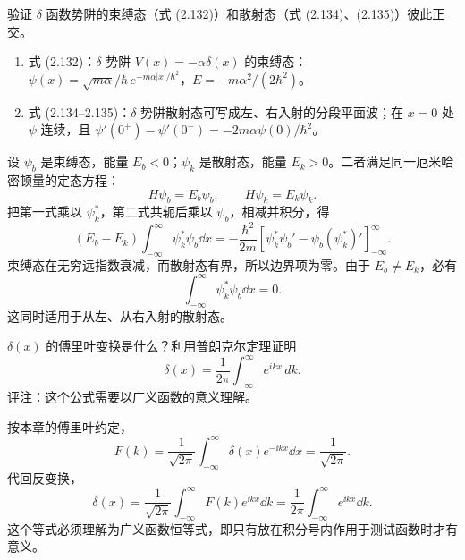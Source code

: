 \begin{question}
验证 $\delta$ 函数势阱的束缚态（式 (2.132)）和散射态（式 (2.134)、(2.135)）彼此正交。

\par\smallskip
{}
\begin{enumerate}[leftmargin=2.2em,itemsep=0.12em,topsep=0.12em,parsep=0pt]
\item 式 (2.132)：$\delta$ 势阱 $V(x)=-\alpha\delta(x)$ 的束缚态：$\psi(x)=\sqrt{m\alpha}/\hbar\,e^{-m\alpha|x|/\hbar^2}$，$E=-m\alpha^2/(2\hbar^2)$。
\item 式 (2.134--2.135)：$\delta$ 势阱散射态可写成左、右入射的分段平面波；在 $x=0$ 处 $\psi$ 连续，且 $\psi'(0^+)-\psi'(0^-)=-2m\alpha\psi(0)/\hbar^2$。
\end{enumerate}

\end{question}
\begin{solution}
设 $\psi_b$ 是束缚态，能量 $E_b<0$；$\psi_k$ 是散射态，能量 $E_k>0$。二者满足同一厄米哈密顿量的定态方程：
\[
H\psi_b=E_b\psi_b,
\qquad
H\psi_k=E_k\psi_k.
\]
把第一式乘以 $\psi_k^*$，第二式共轭后乘以 $\psi_b$，相减并积分，得
\[
(E_b-E_k)\int_{-\infty}^{\infty}\psi_k^*\psi_b\dd x
=-\frac{\hbar^2}{2m}\left[\psi_k^*\psi_b'-\psi_b(\psi_k^*)'\right]_{-\infty}^{\infty}.
\]
束缚态在无穷远指数衰减，而散射态有界，所以边界项为零。由于 $E_b\ne E_k$，必有
\[
\int_{-\infty}^{\infty}\psi_k^*\psi_b\dd x=0.
\]
这同时适用于从左、从右入射的散射态。
\end{solution}

\begin{question}
$\delta(x)$ 的傅里叶变换是什么？利用普朗克尔定理证明
\[
\delta(x)=\frac{1}{2\pi}\int_{-\infty}^{\infty}e^{ikx}\,dk .
\]
评注：这个公式需要以广义函数的意义理解。
\end{question}
\begin{solution}
按本章的傅里叶约定，
\[
F(k)=\frac1{\sqrt{2\pi}}\int_{-\infty}^{\infty}\delta(x)e^{-\ii kx}\dd x
=\frac1{\sqrt{2\pi}}.
\]
代回反变换，
\[
\delta(x)=\frac1{\sqrt{2\pi}}\int_{-\infty}^{\infty}F(k)e^{\ii kx}\dd k
=\frac1{2\pi}\int_{-\infty}^{\infty}e^{\ii kx}\dd k.
\]
这个等式必须理解为广义函数恒等式，即只有放在积分号内作用于测试函数时才有意义。
\end{solution}


